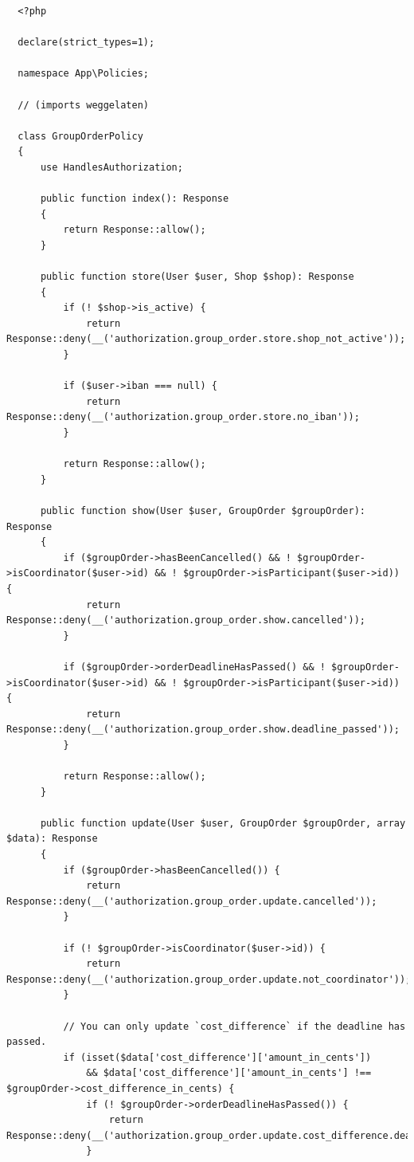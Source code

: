 \begin{verbatim}
  <?php

  declare(strict_types=1);
  
  namespace App\Policies;
  
  // (imports weggelaten)
  
  class GroupOrderPolicy
  {
      use HandlesAuthorization;
  
      public function index(): Response
      {
          return Response::allow();
      }
  
      public function store(User $user, Shop $shop): Response
      {
          if (! $shop->is_active) {
              return Response::deny(__('authorization.group_order.store.shop_not_active'));
          }
  
          if ($user->iban === null) {
              return Response::deny(__('authorization.group_order.store.no_iban'));
          }
  
          return Response::allow();
      }
  
      public function show(User $user, GroupOrder $groupOrder): Response
      {
          if ($groupOrder->hasBeenCancelled() && ! $groupOrder->isCoordinator($user->id) && ! $groupOrder->isParticipant($user->id)) {
              return Response::deny(__('authorization.group_order.show.cancelled'));
          }
  
          if ($groupOrder->orderDeadlineHasPassed() && ! $groupOrder->isCoordinator($user->id) && ! $groupOrder->isParticipant($user->id)) {
              return Response::deny(__('authorization.group_order.show.deadline_passed'));
          }
  
          return Response::allow();
      }
  
      public function update(User $user, GroupOrder $groupOrder, array $data): Response
      {
          if ($groupOrder->hasBeenCancelled()) {
              return Response::deny(__('authorization.group_order.update.cancelled'));
          }
  
          if (! $groupOrder->isCoordinator($user->id)) {
              return Response::deny(__('authorization.group_order.update.not_coordinator'));
          }
  
          // You can only update `cost_difference` if the deadline has passed.
          if (isset($data['cost_difference']['amount_in_cents'])
              && $data['cost_difference']['amount_in_cents'] !== $groupOrder->cost_difference_in_cents) {
              if (! $groupOrder->orderDeadlineHasPassed()) {
                  return Response::deny(__('authorization.group_order.update.cost_difference.deadline_not_passed'));
              }
  

\end{verbatim}
